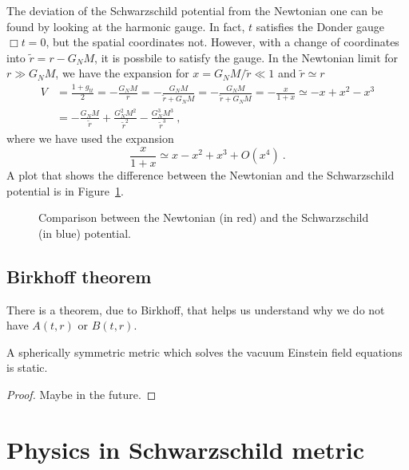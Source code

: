     The deviation of the Schwarzschild potential from the Newtonian one can be found by looking at the harmonic gauge. In fact, $t$ satisfies the Donder gauge $\Box t = 0$, but the spatial coordinates not. However, with a change of coordinates into $\tilde r = r - G_N M$, it is possbile to satisfy the gauge. In the Newtonian limit for $r \gg G_N M$, we have the expansion for $x = G_N M / \tilde r \ll 1$ and $\tilde r \simeq r$
    \begin{equation*}
    \begin{aligned}
        V & = \frac{1 + g_{tt}}{2} = - \frac{G_N M}{r} = - \frac{G_N M}{\tilde r + G_N M} = - \frac{G_N M}{\tilde r + G_N M} = - \frac{x}{1 + x} \simeq - x + x^2 - x^3 \\ & = - \frac{G_N M}{\tilde r} +  \frac{G_N^2 M^2}{\tilde r^2} - \frac{G_N^3 M^3}{\tilde r^3} ~,
    \end{aligned}
    \end{equation*}
    where we have used the expansion 
    \begin{equation*}
        \frac{x}{1+x} \simeq x - x^2 + x^3 + O(x^4) ~.
    \end{equation*}
    A plot that shows the difference between the Newtonian and the Schwarzschild potential is in Figure~\ref{fig:pot}. 

    \begin{figure}
        \centering
        \caption{Comparison between the Newtonian (in red) and the Schwarzschild (in blue) potential.}
        \label{fig:pot}
    \end{figure}

\section{Birkhoff theorem}

    There is a theorem, due to Birkhoff, that helps us understand why we do not have $A(t, r)$ or $B(t, r)$. 
    \begin{theorem}[Birkhoff]
        A spherically symmetric metric which solves the vacuum Einstein field equations is static.
    \end{theorem}
    \begin{proof}
        Maybe in the future.
    \end{proof}

\chapter{Physics in Schwarzschild metric}

